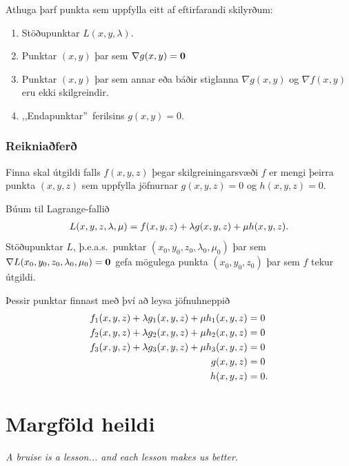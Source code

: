 \documentclass[a4paper,10pt,icelandic]{sphinxmanual}
\begin{document}
Athuga þarf punkta sem uppfylla eitt af eftirfarandi skilyrðum:
\begin{enumerate}
\item {} 
Stöðupunktar \(L(x,y,\lambda)\).

\item {} 
Punktar \((x,y)\) þar sem \(\nabla g(x,y)=\mbox{${\bf 0}$}\)

\item {} 
Punktar \((x,y)\) þar sem annar eða báðir stiglanna
\(\nabla g(x,y)\) og \(\nabla f(x,y)\) eru ekki skilgreindir.

\item {} 
,,Endapunktar” ferilsins \(g(x,y)=0\).

\end{enumerate}


\subsection{Reikniaðferð}
\label{Kafli3:id14}
Finna skal útgildi falls \(f(x,y,z)\) þegar skilgreiningarsvæði
\(f\) er mengi þeirra punkta \((x,y,z)\) sem uppfylla jöfnurnar
\(g(x,y,z)=0\) og \(h(x,y,z)=0\).

Búum til Lagrange-fallið
\begin{gather}
\begin{split}L(x,y,z,\lambda,\mu)=f(x,y,z)+\lambda g(x,y,z)+\mu h(x,y,z).\end{split}\notag
\end{gather}
Stöðupunktar \(L\), þ.e.a.s. punktar
\((x_0,y_0,z_0,\lambda_0,\mu_0)\) þar sem
\(\nabla L(x_0,y_0,z_0,\lambda_0,\mu_0)=\mbox{${\bf 0}$}\) gefa
mögulega punkta \((x_0,y_0,z_0)\) þar sem \(f\) tekur útgildi.

Þessir punktar finnast með því að leysa jöfnuhneppið
\begin{gather}
\begin{split}\begin{aligned}
f_1(x,y,z)+\lambda g_1(x,y,z)+\mu h_1(x,y,z)&=0\\
f_2(x,y,z)+\lambda g_2(x,y,z)+\mu h_2(x,y,z)&=0\\
f_3(x,y,z)+\lambda g_3(x,y,z)+\mu h_3(x,y,z)&=0\\
g(x,y,z)&=0\\
h(x,y,z)&=0.\end{aligned}\end{split}\notag
\end{gather}

\chapter{Margföld heildi}
\label{Kafli4::doc}\label{Kafli4:margfold-heildi}
\emph{A bruise is a lesson... and each lesson makes us better.}
\end{document}
